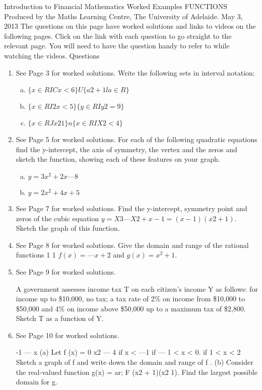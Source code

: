 \documentclass[a4paper,12pt]{article}
\begin{document}
Introduction to Financial Mathematics Worked Examples FUNCTIONS 
Produced by the Maths Learning Centre, The University of Adelaide. May 3, 2013 
The questions on this page have worked solutions and links to videos on the following pages. 
Click on the link with each question to go straight to the relevant page. You will need to have the question handy to refer to while watching the videos. 
Questions 
\begin{enumerate}
\item  See Page 3 for worked solutions. Write the following sets in interval notation: 
\begin{enumerate}[(a)]
    \item $\{x \in RI Cx<6 \} U \{a2+1 la \in R\} $
    \item $\{x \in R I 2x < 5\} \{y \in R I y2 = 9\} $
    \item $\{x \in R J x2 1\} n \{x \in R I X2 <4\} $
\end{enumerate}


\item See Page 5 for worked solutions. 
For each of the following quadratic equations find the y-intercept, the axis of symmetry, the vertex and the zeros 
and sketch the function, showing each of these features on your graph. 
\begin{enumerate}[(a)]
    \item $y = 3x^2 + 2x — 8$ 
    \item $y = 2x^2 + 4x + 5$ 
\end{enumerate}
\item 
See Page 7 for worked solutions. Find the y-intercept, symmetry point and zeros of the cubic equation $y = X3 — X2 + x - 1 = (x - 1)(x2 + 1)$. 
Sketch the graph of this function. 
\item  See Page 8 for worked solutions. Give the domain and range 
of the rational functions 1 1 $f(x) = — x + 2$ and $g(x) = x^2 +1$. 

\item See Page 9 for worked solutions. 

A government assesses income tax T on each citizen's income Y as follows: for income up to \$10,000, no tax; a tax rate of 2\% on 
income from \$10,000 to \$50,000 and 4\% on income above \$50,000 up to a maximum tax of \$2,800. Sketch T as a function of Y. 


\item See Page 10 for worked solutions. 
{-1 — x (a) Let f (x) = 0 x2 — 4 
if x < —1 if — 1 < x < 0. if 1 < x < 2 
Sketch a graph of f and write down the domain and range of f . 
(b) Consider the real-valued function g(x) =  ar; F  (x2 + 1)(x2 1). 
Find the largest possible domain for g. 

}
\end{enumerate}
\end{document}
